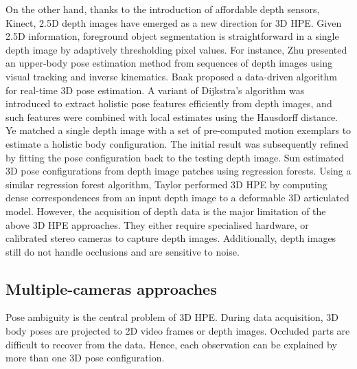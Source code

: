 On the other hand, thanks to the introduction of affordable depth sensors, \eg Kinect, 2.5D depth images have emerged as a new direction for 3D HPE.
Given 2.5D information, foreground object segmentation is straightforward in a single depth image by adaptively thresholding pixel values.   
For instance, Zhu \etal \cite{Zhu2008a} presented an upper-body pose estimation method from sequences of depth images using visual tracking and inverse kinematics. 
Baak \etal \cite{Baak2011} proposed a data-driven algorithm for real-time 3D pose estimation. A variant of Dijkstra's algorithm was introduced to extract holistic pose features efficiently from depth images, and such features were combined with local estimates using the Hausdorff distance. 
Ye \etal \cite{Ye2011} matched a single depth image with a set of pre-computed motion exemplars to estimate a holistic body configuration. The initial result was subsequently refined by fitting the pose configuration back to the testing depth image. 
Sun \etal \cite{Sun2012} estimated 3D pose configurations from depth image patches using regression forests.  
Using a similar regression forest algorithm, Taylor \etal \cite{Taylor2012} performed 3D HPE by computing dense correspondences from an input depth image to a deformable 3D articulated model.  
However, the acquisition of depth data is the major limitation of the above 3D HPE approaches. They either require specialised hardware, or calibrated stereo cameras to capture depth images. Additionally, depth images still do not handle occlusions and are sensitive to noise. 



\subsection{Multiple-cameras approaches} 

Pose ambiguity is the central problem of 3D HPE. 
During data acquisition, 3D body poses are projected to 2D video frames or depth images. Occluded parts are difficult to recover from the data. Hence, each observation can be explained by more than one 3D pose configuration. 

